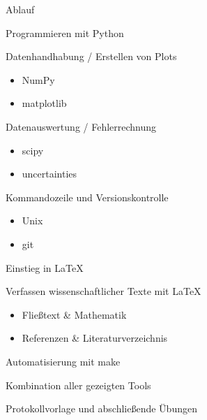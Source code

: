\begin{frame}{Ablauf}
  \begin{description}
    \item[Montag] Programmieren mit Python
    \item[Dienstag] Datenhandhabung / Erstellen von Plots
      \begin{itemize}
        \item NumPy
        \item matplotlib
      \end{itemize}
    \item[Mittwoch] Datenauswertung / Fehlerrechnung
      \begin{itemize}
        \item scipy
        \item uncertainties
      \end{itemize}
    \item[Donnerstag] Kommandozeile und Versionskontrolle
      \begin{itemize}
        \item Unix
        \item git
      \end{itemize}
    \item[Freitag] Einstieg in \LaTeX
    \item[Nächste Woche] Verfassen wissenschaftlicher Texte mit \LaTeX{}
      \begin{itemize}
        \item Fließtext \& Mathematik
        \item Referenzen \& Literaturverzeichnis
      \end{itemize}
      \item Automatisierung mit make
      \item Kombination aller gezeigten Tools
      \item Protokollvorlage und abschließende Übungen
  \end{description}
\end{frame}
